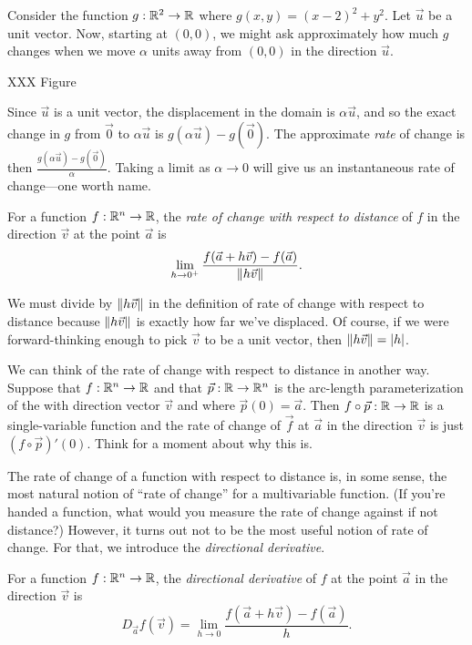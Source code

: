 Consider the function $g:\mathbb{R}^2\to\mathbb{R}$ where $g(x,y)=(x-2)^2+y^2$.  Let $\vec u$ be a unit
vector.  Now, starting at $(0,0)$, we might ask approximately how much $g$ changes
when we move $\alpha$ units away from $(0,0)$ in the direction $\vec u$.

XXX Figure

Since $\vec u$ is a unit vector, the displacement in the domain is $\alpha\vec u$, and so the
exact change in $g$ from $\vec 0$ to $\alpha\vec u$ is $g(\alpha\vec u)-g(\vec 0)$.  The approximate
\emph{rate} of change is then $\frac{g(\alpha\vec u)-g(\vec 0)}{\alpha}$.  Taking
a limit as $\alpha\to 0$ will give us an instantaneous rate of change---one worth name.

\begin{definition}
	For a function $f:\mathbb{R}^n\to\mathbb{R}$, the \emph{rate of change with respect to distance} of $f$
	in the direction $\vec v$ at the point $\vec a$ is
	\[
		\lim_{h\to 0^+}\frac{f(\vec a+h\vec v)-f(\vec a)}{\lVert h\vec v\rVert}.
	\]
\end{definition}

We must divide by $\lVert h\vec v\rVert$ in the definition of rate of change with respect to distance
because $\lVert h\vec v\rVert$ is exactly how far we've displaced.  Of course, if we were forward-thinking
enough to pick $\vec v$ to be a unit vector, then $\lVert h\vec v\rVert=\lvert h\rvert$.

We can think of the rate of change with respect to distance in another way.  Suppose that $f:\mathbb{R}^n\to \mathbb{R}$
and that $\vec p:\mathbb{R}\to\mathbb{R}^n$ is the arc-length parameterization of the with direction
vector $\vec v$ and where $\vec p(0)=\vec a$.  Then $f\circ \vec p:\mathbb{R}\to\mathbb{R}$ is a single-variable
function and the rate of change of $\vec f$ at $\vec a$ in the direction $\vec v$ is just $(f\circ\vec p)'(0)$.
Think for a moment about why this is.

The rate of change of a function with respect to distance is, in some sense, the most natural
notion of ``rate of change'' for a multivariable function.  (If you're handed a function, what
would you measure the rate of change against if not distance?)  However, it turns out not
to be the most useful notion of rate of change.  For that, we introduce the 
\emph{directional derivative}.

\begin{definition}
	For a function $f:\mathbb{R}^n\to\mathbb{R}$, the \emph{directional derivative} of $f$ at the point $\vec a$
	in the direction $\vec v$ is
	\[
		D_{\vec a}f(\vec v) = \lim_{h\to0}\frac{f(\vec a+h\vec v)-f(\vec a)}{h}.
	\]
\end{definition}

